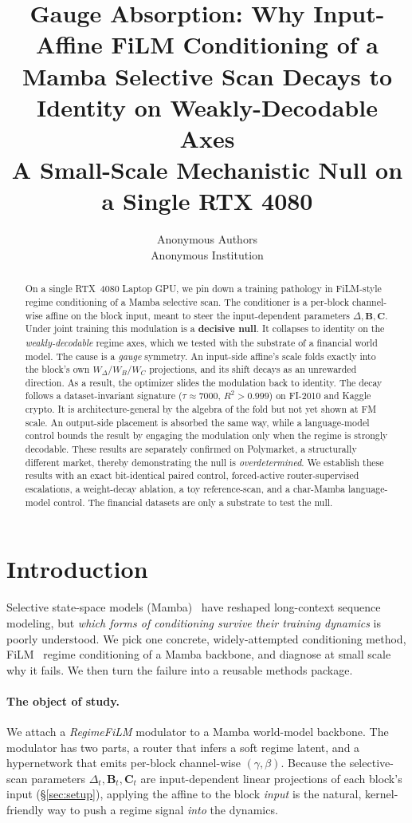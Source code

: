 \documentclass{article}
\title{Gauge Absorption: Why Input-Affine FiLM Conditioning of a Mamba
Selective Scan Decays to Identity on Weakly-Decodable Axes\\
{\large A Small-Scale Mechanistic Null on a Single RTX 4080}}
\author{Anonymous Authors \\ Anonymous Institution}
\begin{document}
\maketitle

\begin{abstract}
On a single RTX~4080 Laptop GPU, we pin down a training pathology in FiLM-style
regime conditioning of a Mamba selective scan. The conditioner is a per-block
channel-wise affine on the block input, meant to steer the input-dependent
parameters $\Delta,\mathbf{B},\mathbf{C}$. Under joint training this modulation is
a \textbf{decisive null}. It collapses to identity on the \emph{weakly-decodable} regime
axes, which we tested with the substrate of a financial world model. The cause is a \emph{gauge} symmetry. An input-side affine's scale folds exactly into the block's own $W_\Delta/W_B/W_C$
projections, and its shift decays as an unrewarded direction. As a result, the optimizer slides the modulation back to identity. The decay follows a dataset-invariant signature ($\tau\approx7000$, $R^2>0.999$) on FI-2010 and Kaggle crypto. It is architecture-general by the algebra of the fold but not yet shown at FM scale. An output-side placement is absorbed the same way, while a language-model control bounds the
result by engaging the modulation only when the regime is strongly decodable. These results are separately confirmed on Polymarket, a structurally different market, thereby demonstrating the null is \emph{overdetermined}. We
establish these results with an exact bit-identical paired control, forced-active router-supervised escalations, a weight-decay ablation, a toy reference-scan, and a char-Mamba language-model control. The financial datasets are only a substrate to test the null.
\end{abstract}

\section{Introduction}\label{sec:intro}

Selective state-space models (Mamba)~\citep{gu2024mamba} have reshaped long-context sequence modeling, but
\emph{which forms of conditioning survive their training dynamics} is poorly
understood. We pick one concrete, widely-attempted conditioning method, FiLM~\citep{perez2018film}
regime conditioning of a Mamba backbone, and diagnose at small scale why it fails.
We then turn the failure into a reusable methods package.

\paragraph{The object of study.}
We attach a \emph{RegimeFiLM} modulator to a Mamba world-model backbone. The
modulator has two parts, a router that infers a soft regime latent, and a
hypernetwork that emits per-block channel-wise $(\gamma,\beta)$. Because the
selective-scan parameters $\Delta_t,\mathbf{B}_t,\mathbf{C}_t$ are input-dependent
linear projections of each block's input (\S\ref{sec:setup}), applying the affine
to the block \emph{input} is the natural, kernel-friendly way to push a regime
signal \emph{into} the dynamics.
\end{document}

